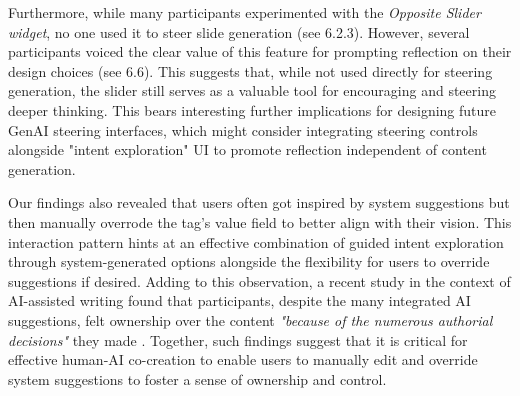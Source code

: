 

Furthermore, while many participants experimented with the \textit{Opposite Slider widget}, no one used it to steer slide generation (see 6.2.3). 
However, several participants voiced the clear value of this feature for prompting reflection on their design choices (see 6.6). 
This suggests that, while not used directly for steering generation, the slider still serves as a valuable tool for encouraging and steering deeper thinking. 
This bears interesting further implications for designing future GenAI steering interfaces, which might consider integrating steering controls alongside "intent exploration" UI to promote reflection independent of content generation.

Our findings also revealed that users often got inspired by system suggestions but then manually overrode the tag's value field to better align with their vision. 
This interaction pattern hints at an effective combination of guided intent exploration through system-generated options alongside the flexibility for users to override suggestions if desired. 
Adding to this observation, a recent study in the context of AI-assisted writing found that participants, despite the many integrated AI suggestions, felt ownership over the content \textit{"because of the numerous authorial decisions"} they made \cite{singh_where_2023}. Together, such findings suggest that it is critical for effective human-AI co-creation to enable users to manually edit and override system suggestions to foster a sense of ownership and control. 

